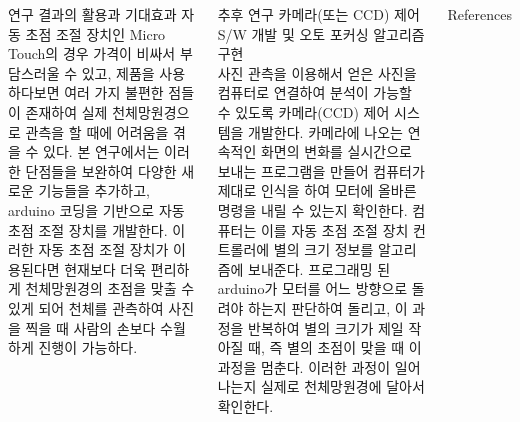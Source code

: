\documentclass{gshs_poster_beamer}
\begin{document}
\begin{columns}[T]
\begin{posterbox}[colbacktitle=purple,coltitle=white,colback=purple!5]{연구 결과의 활용과 기대효과}
자동 초점 조절 장치인 Micro Touch의 경우 가격이 비싸서 부담스러울 수 있고, 제품을 사용하다보면 여러 가지 불편한 점들이 존재하여 실제 천체망원경으로 관측을 할 때에 어려움을 겪을 수 있다. 본 연구에서는 이러한 단점들을 보완하여 다양한 새로운 기능들을 추가하고, arduino 코딩을 기반으로 자동 초점 조절 장치를 개발한다. 이러한 자동 초점 조절 장치가 이용된다면 현재보다 더욱 편리하게 천체망원경의 초점을 맞출 수 있게 되어 천체를 관측하여 사진을 찍을 때 사람의 손보다 수월하게 진행이 가능하다.
\end{posterbox}

\vspace{1em}

\begin{posterbox}[colbacktitle=brown,coltitle=white,colback=brown!5]{추후 연구}
	카메라(또는 CCD) 제어 S/W 개발 및 오토 포커싱 알고리즘 구현\\
	사진 관측을 이용해서 얻은 사진을 컴퓨터로 연결하여 분석이 가능할 수 있도록 카메라(CCD) 제어 시스템을 개발한다. 카메라에 나오는 연속적인 화면의 변화를 실시간으로 보내는 프로그램을 만들어 컴퓨터가 제대로 인식을 하여 모터에 올바른 명령을 내릴 수 있는지 확인한다. 컴퓨터는 이를 자동 초점 조절 장치 컨트롤러에 별의 크기 정보를 알고리즘에 보내준다. 프로그래밍 된 arduino가 모터를 어느 방향으로 돌려야 하는지 판단하여 돌리고, 이 과정을 반복하여 별의 크기가 제일 작아질 때, 즉 별의 초점이 맞을 때 이 과정을 멈춘다. 이러한 과정이 일어나는지 실제로 천체망원경에 달아서 확인한다.
\end{posterbox}

\vspace{1em}

\begin{posterbox}[colbacktitle=yellow,coltitle=black,colback=yellow!5]{References}
	

\end{posterbox}



\end{columns}
\end{document}
